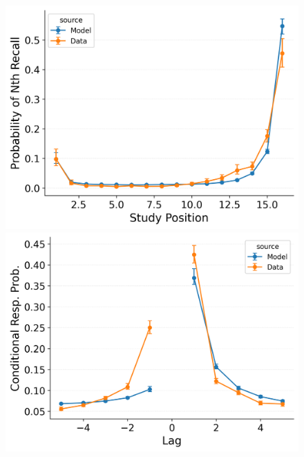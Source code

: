 \documentclass[
  man,
  floatsintext,
  longtable,
  nolmodern,
  notxfonts,
  notimes,
  draftfirst,
  colorlinks=true,linkcolor=blue,citecolor=blue,urlcolor=blue]{apa7}
\begin{document}
\begin{figure}
\begin{minipage}{0.33\linewidth}
\includegraphics{figures/HealeyKahana2014_CRU_with_Pre-Expt__Primacy__and_StartDrift_Fitting_pnr.png}\end{minipage}%
%
\begin{minipage}{0.33\linewidth}
\includegraphics{figures/HealeyKahana2014_CRU_with_Pre-Expt__Primacy__and_StartDrift_Fitting_crp.png}\end{minipage}%
%
\begin{minipage}{0.33\linewidth}

\end{minipage}
\end{figure}
\end{document}
